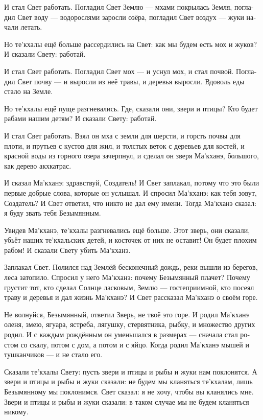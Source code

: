 \documentclass[a4paper,12pt,fleqn]{book}\usepackage{cooltooltips}\usepackage{polyglossia}\setdefaultlanguage[babelshorthands=true]{russian}\setotherlanguage{english}\defaultfontfeatures{Ligatures=TeX,Mapping=tex-text} \usepackage{xcolor}\definecolor{lightgray}{HTML}{bbbbbb}\color{lightgray}\newcommand{\ml}[3]{\textenglish{\textcolor{black}{#3}}}
\newcommand{\FA}[1]{\footnotetext{#1 \emph{\ml{$0$}{---~Прим.~авт.}{---~Author.}}}}
\begin{document}
{И стал Свет работать.
Погладил Свет Землю --- мхами покрылась Земля, погладил Свет воду --- водорослями заросли озёра, погладил Свет воздух --- жуки начали летать.

Но те'кхалы ещё больше рассердились на Свет: как мы будем есть мох и жуков?
И сказали Свету: работай.

И стал Свет работать.
Погладил Свет мох --- и уснул мох, и стал почвой.
Погладил Свет почву --- и выросли из неё травы, и деревья выросли.
Вдоволь еды стало на Земле.

Но те'кхалы ещё пуще разгневались.
Где, сказали они, звери и птицы?
Кто будет рабами нашим детям?
И сказали Свету: работай.

И стал Свет работать.
Взял он мха с земли для шерсти, и горсть почвы для плоти, и прутьев с кустов для жил, и толстых веток с деревьев для костей, и красной воды из горного озера зачерпнул, и сделал он зверя Ма'кханэ\footnotemark, большого, как дерево акхкатрас.
\FA{Дословно <<зверь, рождающий всех>>.}

И сказал Ма'кханэ: здравствуй, Создатель!
И Свет заплакал, потому что это были первые добрые слова, которые он услышал.
И спросил Ма'кханэ: как тебя зовут, Создатель?
И Свет ответил, что никто не дал ему имени.
Тогда Ма'кханэ сказал: я буду звать тебя Безымянным.

Увидев Ма'кханэ, те'кхалы разгневались ещё больше.
Этот зверь, они сказали, убьёт наших те'кхальских детей, и косточек от них не оставит!
Он будет плохим рабом!
И сказали Свету убить Ма'кханэ.

Заплакал Свет.
Полился над Землёй бесконечный дождь, реки вышли из берегов, леса затопило.
Спросил у него Ма'кханэ: почему Безымянный плачет?
Почему грустит тот, кто сделал Солнце ласковым, Землю --- гостеприимной, кто посеял траву и деревья и дал жизнь Ма'кханэ?
И Свет рассказал Ма'кханэ о своём горе.

Не волнуйся, Безымянный, ответил Зверь, не твоё это горе.
И родил Ма'кханэ оленя, змею, ягуара, ястреба, лягушку, стервятника, рыбку, и множество других родил.
И с каждым рождённым он уменьшался в размерах --- сначала стал ростом со скалу, потом с дом, а потом и с яйцо.
Когда родил Ма'кханэ мышей и тушканчиков --- и не стало его.

Сказали те'кхалы Свету: пусть звери и птицы и рыбы и жуки нам поклонятся.
А звери и птицы и рыбы и жуки сказали: не будем мы кланяться те'кхалам, лишь Безымянному мы поклонимся.
Свет сказал: я не хочу, чтобы вы кланялись мне.
Звери и птицы и рыбы и жуки сказали: в таком случае мы не будем кланяться никому.

}
\end{document}

